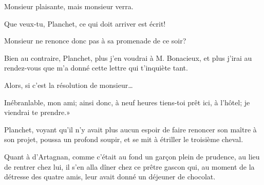 \speak  Monsieur plaisante, mais monsieur verra. 

\speak  Que veux-tu, Planchet, ce qui doit arriver est écrit! 

\speak  Monsieur ne renonce donc pas à sa promenade de ce soir? 

\speak  Bien au contraire, Planchet, plus j'en voudrai à M. Bonacieux, et plus j'irai au rendez-vous que m'a donné cette lettre qui t'inquiète tant. 

\speak  Alors, si c'est la résolution de monsieur\dots 

\speak  Inébranlable, mon ami; ainsi donc, à neuf heures tiens-toi prêt ici, à l'hôtel; je viendrai te prendre.» 

Planchet, voyant qu'il n'y avait plus aucun espoir de faire renoncer son maître à son projet, poussa un profond soupir, et se mit à étriller le troisième cheval. 

Quant à d'Artagnan, comme c'était au fond un garçon plein de prudence, au lieu de rentrer chez lui, il s'en alla dîner chez ce prêtre gascon qui, au moment de la détresse des quatre amis, leur avait donné un déjeuner de chocolat. 